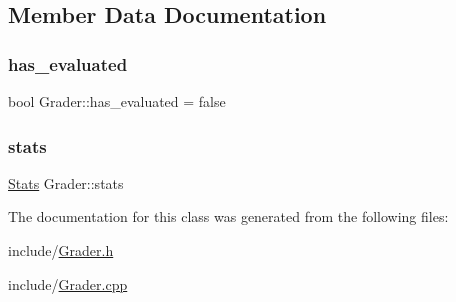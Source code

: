 \subsection{Member Data Documentation}
\hypertarget{class_grader_a88ad71fe69b966fa4faf4c77d4b09842}{}\label{class_grader_a88ad71fe69b966fa4faf4c77d4b09842} 
\subsubsection{\texorpdfstring{has\+\_\+evaluated}{has\_evaluated}}
{\footnotesize\ttfamily bool Grader\+::has\+\_\+evaluated = false}

\hypertarget{class_grader_aaa7a08227037ccd8b20d02d372fe567f}{}\label{class_grader_aaa7a08227037ccd8b20d02d372fe567f} 
\subsubsection{\texorpdfstring{stats}{stats}}
{\footnotesize\ttfamily \hyperlink{class_stats}{Stats} Grader\+::stats}



The documentation for this class was generated from the following files\+:\begin{DoxyCompactItemize}
\item 
include/\hyperlink{_grader_8h}{Grader.\+h}\item 
include/\hyperlink{_grader_8cpp}{Grader.\+cpp}\end{DoxyCompactItemize}
